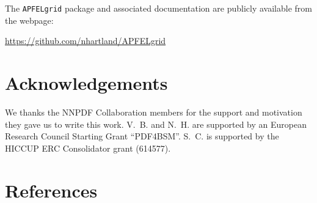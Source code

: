 \documentclass[preprint,12pt]{elsarticle}
\begin{document}
The {\tt APFELgrid} package and associated documentation are publicly
available from the webpage:
\begin{center}
\url{https://github.com/nhartland/APFELgrid}
\end{center}

\section*{Acknowledgements}

We thanks the NNPDF Collaboration members for the support and
motivation they gave us to write this work. V.~B. and N.~H. are
supported by an European Research Council Starting Grant ``PDF4BSM''.
S.~C. is supported by the HICCUP ERC Consolidator grant (614577).





\section*{References}








\end{document}
